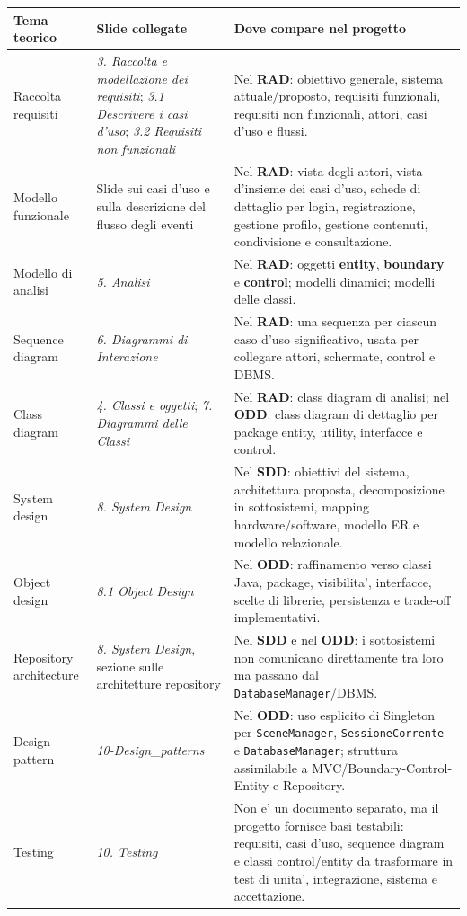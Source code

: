 ﻿\documentclass[11pt,a4paper]{article}
\newcommand{\doc}[1]{\textbf{#1}}
\newcommand{\slide}[1]{\emph{#1}}
\newcommand{\term}[1]{\textbf{#1}}
\begin{document}
{\small
\begin{longtable}{L{3.0cm}L{4.4cm}L{6.0cm}}
\toprule
\textbf{Tema teorico} & \textbf{Slide collegate} & \textbf{Dove compare nel progetto} \\
\midrule
\endhead
Raccolta requisiti & \slide{3. Raccolta e modellazione dei requisiti};
\slide{3.1 Descrivere i casi d'uso}; \slide{3.2 Requisiti non funzionali} &
Nel \doc{RAD}: obiettivo generale, sistema attuale/proposto, requisiti funzionali,
requisiti non funzionali, attori, casi d'uso e flussi. \\
Modello funzionale & Slide sui casi d'uso e sulla descrizione del flusso degli eventi &
Nel \doc{RAD}: vista degli attori, vista d'insieme dei casi d'uso, schede di dettaglio
per login, registrazione, gestione profilo, gestione contenuti, condivisione e
consultazione. \\
Modello di analisi & \slide{5. Analisi} &
Nel \doc{RAD}: oggetti \term{entity}, \term{boundary} e \term{control}; modelli dinamici;
modelli delle classi. \\
Sequence diagram & \slide{6. Diagrammi di Interazione} &
Nel \doc{RAD}: una sequenza per ciascun caso d'uso significativo, usata per collegare
attori, schermate, control e DBMS. \\
Class diagram & \slide{4. Classi e oggetti}; \slide{7. Diagrammi delle Classi} &
Nel \doc{RAD}: class diagram di analisi; nel \doc{ODD}: class diagram di dettaglio per
package entity, utility, interfacce e control. \\
System design & \slide{8. System Design} &
Nel \doc{SDD}: obiettivi del sistema, architettura proposta, decomposizione in
sottosistemi, mapping hardware/software, modello ER e modello relazionale. \\
Object design & \slide{8.1 Object Design} &
Nel \doc{ODD}: raffinamento verso classi Java, package, visibilita', interfacce, scelte
di librerie, persistenza e trade-off implementativi. \\
Repository architecture & \slide{8. System Design}, sezione sulle architetture repository &
Nel \doc{SDD} e nel \doc{ODD}: i sottosistemi non comunicano direttamente tra loro ma
passano dal \texttt{DatabaseManager}/DBMS. \\
Design pattern & \slide{10-Design\_patterns} &
Nel \doc{ODD}: uso esplicito di Singleton per \texttt{SceneManager},
\texttt{SessioneCorrente} e \texttt{DatabaseManager}; struttura assimilabile a
MVC/Boundary-Control-Entity e Repository. \\
Testing & \slide{10. Testing} &
Non e' un documento separato, ma il progetto fornisce basi testabili: requisiti, casi
d'uso, sequence diagram e classi control/entity da trasformare in test di unita',
integrazione, sistema e accettazione. \\
\bottomrule
\end{longtable}
}
\end{document}
